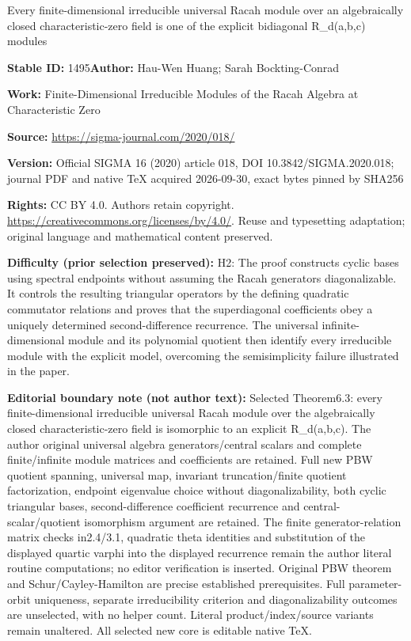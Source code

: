 \documentclass[11pt]{article}
\numberwithin{equation}{section}
\numberwithin{equation}{section}
\begin{document}
\begin{center}\Large Every finite-dimensional irreducible universal Racah module over an algebraically closed characteristic-zero field is one of the explicit bidiagonal R\_d(a,b,c) modules\end{center}
\noindent\textbf{Stable ID:} 1495\quad\textbf{Author:} Hau-Wen Huang; Sarah Bockting-Conrad\par
\noindent\textbf{Work:} Finite-Dimensional Irreducible Modules of the Racah Algebra at Characteristic Zero\par
\noindent\textbf{Source:} \url{https://sigma-journal.com/2020/018/}\par
\noindent\textbf{Version:} Official SIGMA 16 (2020) article 018, DOI 10.3842/SIGMA.2020.018; journal PDF and native TeX acquired 2026-09-30, exact bytes pinned by SHA256\par
\noindent\textbf{Rights:} CC BY 4.0. Authors retain copyright. \url{https://creativecommons.org/licenses/by/4.0/}. Reuse and typesetting adaptation; original language and mathematical content preserved.\par
\noindent\textbf{Difficulty (prior selection preserved):} {\CJKfont H2: The proof constructs cyclic bases using spectral endpoints without assuming the Racah generators diagonalizable. It controls the resulting triangular operators by the defining quadratic commutator relations and proves that the superdiagonal coefficients obey a uniquely determined second-difference recurrence. The universal infinite-dimensional module and its polynomial quotient then identify every irreducible module with the explicit model, overcoming the semisimplicity failure illustrated in the paper.}\par
\medskip\noindent\textbf{Editorial boundary note (not author text):} Selected Theorem6.3: every finite-dimensional irreducible universal Racah module over the algebraically closed characteristic-zero field is isomorphic to an explicit R\_d(a,b,c). The author original universal algebra generators/central scalars and complete finite/infinite module matrices and coefficients are retained. Full new PBW quotient spanning, universal map, invariant truncation/finite quotient factorization, endpoint eigenvalue choice without diagonalizability, both cyclic triangular bases, second-difference coefficient recurrence and central-scalar/quotient isomorphism argument are retained. The finite generator-relation matrix checks in2.4/3.1, quadratic theta identities and substitution of the displayed quartic varphi into the displayed recurrence remain the author literal routine computations; no editor verification is inserted. Original PBW theorem and Schur/Cayley-Hamilton are precise established prerequisites. Full parameter-orbit uniqueness, separate irreducibility criterion and diagonalizability outcomes are unselected, with no helper count. Literal product/index/source variants remain unaltered. All selected new core is editable native TeX.\par
\end{document}
